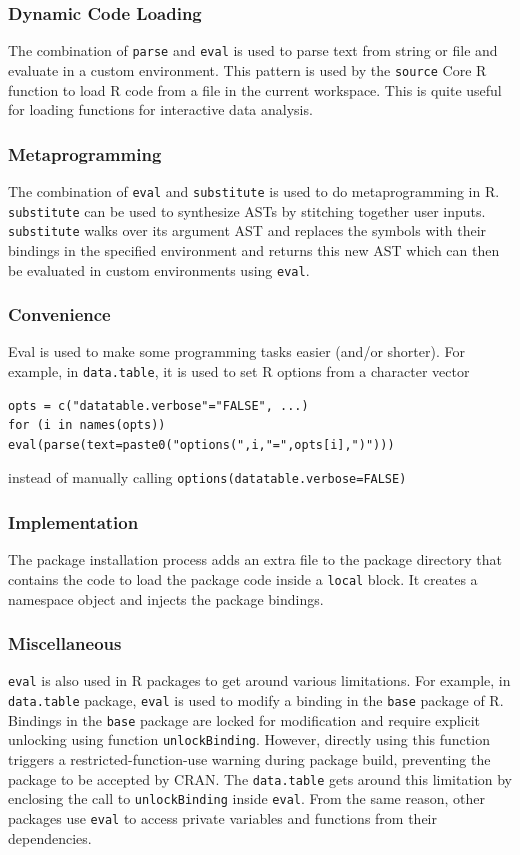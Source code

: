 \documentclass[a4paper,USenglish,cleveref, autoref, thm-restate]{lipics-v2019}
\newcommand{\eval}{\texttt{eval}\xspace}
\renewcommand{\parse}{\c{parse}}
\newcommand{\source}{\c{source}}
\newcommand{\local}{\c{local}}
\newcommand{\unlockBinding}{\c{unlockBinding}}
\newcommand{\substitute}{\c{substitute}}
\newcommand{\datatable}{\c{data.table}}
\newcommand{\base}{\c{base}}
\renewcommand{\c}[1]{\lstinline{#1}\xspace}
\begin{document}
\subsubsection{Dynamic Code Loading} The combination of \parse and \eval is
used to parse text from string or file and evaluate in a custom environment.
This pattern is used by the \source Core R function to load R code from a
file in the current workspace. This is quite useful for loading functions
for interactive data analysis.

\subsubsection{Metaprogramming} The combination of \eval and \substitute is
 used to do metaprogramming in R. \substitute can be used to synthesize ASTs
 by stitching together user inputs. \substitute walks over its argument AST
 and replaces the symbols with their bindings in the specified environment
 and returns this new AST which can then be evaluated in custom environments
 using \eval.

  \subsubsection{Convenience} Eval is used to make some programming tasks easier (and/or shorter). For example, in \c{data.table}, it is used to set R options from a character vector
  \begin{lstlisting}
opts = c("datatable.verbose"="FALSE", ...)
for (i in names(opts)) eval(parse(text=paste0("options(",i,"=",opts[i],")")))

  \end{lstlisting}
  instead of manually calling \c{options(datatable.verbose=FALSE)}

  \subsubsection{Implementation}
  The package installation process adds an extra file to the package directory
  that contains the code to load the package code inside a \local block. It
  creates a namespace object and injects the package bindings.

  \subsubsection{Miscellaneous} \eval is also used in R packages to get around
  various limitations. For example, in \datatable package, \eval is used to
  modify a binding in the \base package of R. Bindings in the \base package are
  locked for modification and require explicit unlocking using 
  function \unlockBinding. However, directly using this function triggers a
  restricted-function-use warning during package build, preventing the package
  to be accepted by CRAN. The \datatable gets around this limitation by
  enclosing the call to \unlockBinding inside \eval. From the same reason, other
  packages use \eval to access private variables and functions from their
  dependencies.
\end{document}
